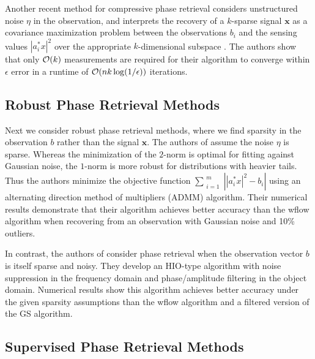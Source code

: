 Another recent method for compressive phase retrieval considers unstructured noise $\eta$ in the observation, and interprets the recovery of a $k$-sparse signal $\mathbf{x}$ as a covariance maximization problem between the observations $b_i$ and the sensing values $|a_i^*x|^2$ over the appropriate $k$-dimensional subspace \cite{zhang2017fast}.  
The authors show that only ${\mathcal O}(k)$ measurements are required for their algorithm to converge within $\epsilon$ error in a runtime of ${\mathcal O}(nk \log(1/ \epsilon))$ iterations.




\subsection{Robust Phase Retrieval Methods}


Next we consider robust phase retrieval methods, where we find sparsity in the observation $b$ rather than the signal $\mathbf{x}$.  
The authors of \cite{jiang2017robust} assume the noise $\eta$ is sparse.  
Whereas the minimization of the $2$-norm is optimal for fitting against Gaussian noise, the $1$-norm is more robust for distributions with heavier tails.  
Thus the authors minimize the objective function $\sum\limits_{\substack{i=1}}^{\substack{m}} \left| |a_i^*x|^2 - b_i \right|$ using an alternating direction method of multipliers (ADMM) algorithm.  
Their numerical results demonstrate that their algorithm achieves better accuracy than the wflow algorithm when recovering from an observation with Gaussian noise and 10\% outliers.

In contrast, the authors of \cite{katkovnik2017phase} consider phase retrieval when the observation vector $b$ is itself sparse and noisy.  
They develop an HIO-type algorithm with noise suppression in the frequency domain and phase/amplitude filtering in the object domain.  
Numerical results show this algorithm achieves better accuracy under the given sparsity assumptions than the wflow algorithm and a filtered version of the GS algorithm.




\subsection{Supervised Phase Retrieval Methods}

